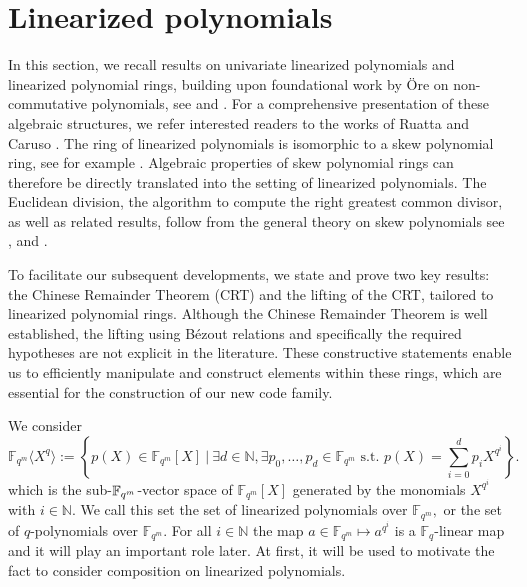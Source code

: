 \documentclass{article}
\newcommand{\tmname}[1]{\textsc{#1}}
\newcommand{\Fqm}{\mathbb{F}_{q^m}}
\theoremstyle{definition}
\begin{document}
\section{Linearized polynomials} \label{linpol}

In this section, we recall results on univariate linearized polynomials and linearized polynomial rings, building upon foundational work by \"{O}re on non-commutative polynomials, see \cite{ore_special_1933} and  \cite{ore_theory_1933}. For a comprehensive presentation of these algebraic structures, we refer interested readers to the works of Ruatta \cite{ruatta_polynomes_2022} and Caruso \cite{caruso_polynomes_nodate}.
The ring of linearized polynomials is isomorphic to a skew polynomial ring, see for example \cite{GluesingLuerssen}. Algebraic properties of skew polynomial
rings can therefore be directly translated into the setting of linearized polynomials. The Euclidean division, the algorithm to compute the right greatest
common divisor, as well as related results, follow from the general theory on skew polynomials see \cite{ore_special_1933}, \cite{ore_theory_1933} and \cite {jacobson2009}.\color{black}

To facilitate our subsequent developments, we state and prove two key results: the Chinese Remainder Theorem (CRT) and the lifting of the CRT, tailored to linearized polynomial rings.   Although the Chinese Remainder Theorem is well established, the lifting using Bézout relations and specifically the required hypotheses are not explicit in the literature. \color{black} These constructive statements enable us to efficiently manipulate and construct elements within these rings, which are essential for the construction of our new code family.

We consider
\[
      \mathbb{F}_{q^m}\langle X^q \rangle
      :=
      \left\{
      p(X) \in \mathbb{F}_{q^m}[X]
      ~|~
      \exists d \in \mathbb{N},\exists
      p_0,\dots,p_d \in \mathbb{F}_{q^m}
      \text{ s.t. }
      p(X) = \sum_{i=0}^d p_i X^{q^i}
      \right\}.
\]
which is the
sub-$\tmname{$\mathbb{F}_{q^m}$}$-vector space of $\mathbb{F}_{q^m} [X]$
generated by the monomials $X^{q^i}$ with $i \in \mathbb{N}$. We call this set the set of linearized polynomials over $\Fqm,$ or the set of $q$-polynomials over $ \Fqm$. For all $i \in
      \mathbb{N}$ the map $a \in \mathbb{F}_{q^m} \mapsto a^{q^i}$ is a
$\mathbb{F}_q$-linear map and it will play an important role later. At first, it will be used to motivate the fact to consider composition on
linearized polynomials.
\end{document}
